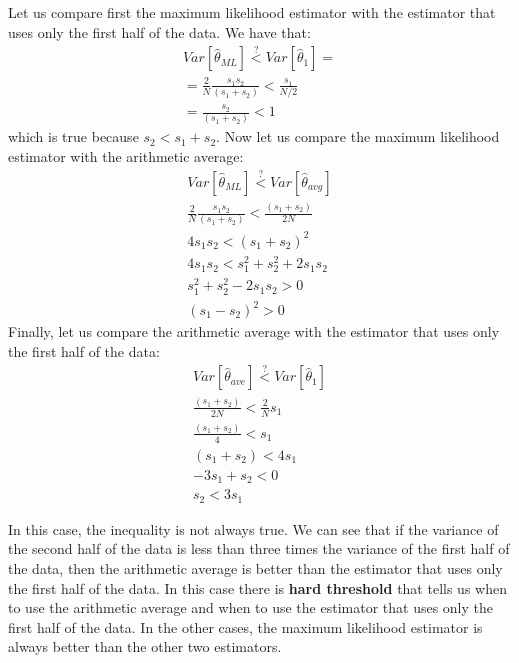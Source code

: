 Let us compare first the maximum likelihood estimator with the estimator that uses only the first half of the data. We have that:
\begin{align*}
    Var[\hat \theta _{ML}]\overset ?< Var[\hat \theta_1]=         \\
    = \frac {2}{ N} \frac{{s_1}s_2}{(s_1+s_2)}<\frac{{s_1}}{ N/2} \\
    = \frac{s_2}{(s_1+s_2)}<1
\end{align*}
which is true because $s_2<s_1+s_2$. Now let us compare the maximum likelihood estimator with the arithmetic average:
\begin{align*}
    Var[\hat \theta _{ML}]\overset ?< Var[\hat \theta_{avg}]     \\
    \frac 2{ N} \frac{s_1s_2}{(s_1+s_2)}< \frac {(s_1+s_2)}{2 N} \\
    4 {s_1s_2}< (s_1+s_2)^2                                      \\
    4 {s_1s_2}< s_1^2+s_2^2+2s_1s_2                              \\
    s_1^2+s_2^2-2s_1s_2>0                                        \\
    (s_1-s_2)^2>0
\end{align*}
Finally, let us compare the arithmetic average with the estimator that uses only the first half of the data:
\begin{align*}
    Var[\hat \theta _{ave}]\overset ?< Var[\hat \theta_{1}] \\
    \frac {(s_1+s_2)}{2 N}<\frac 2{ N}s_1                   \\
    \frac {(s_1+s_2)}{4}< s_1                               \\
    {(s_1+s_2)}< 4{s_1}                                     \\
    -3s_1+s_2<0                                             \\
    s_2<3s_1
\end{align*}

In this case, the inequality is not always true. We can see that if the variance of the second half of the data is less than three times the variance of the first half of the data, then the arithmetic average is better than the estimator that uses only the first half of the data. In this case there is \textbf{hard threshold} that tells us when to use the arithmetic average and when to use the estimator that uses only the first half of the data. In the other cases, the maximum likelihood estimator is always better than the other two estimators.

